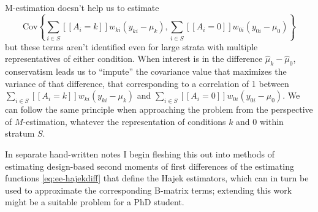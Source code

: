 M-estimation doesn't help us to estimate
\[
\mathrm{Cov}\left\{
\sum_{i\in S} [\![A_i=k]\!] w_{ki} (y_{ki} - \mu_k),
\sum_{i\in S} [\![A_i=0]\!] w_{0i} (y_{0i} - \mu_0)
\right\}
\]
but these terms aren't identified even for large strata with multiple
representatives of either condition. When interest is in the
difference $\hat{\mu}_k - \hat{\mu}_0$, conservatism leads us to
``impute'' the covariance value that maximizes the variance of that difference, that
corresponding to a correlation of 1 between $\sum_{i\in S} [\![A_i=k]\!] w_{ki}
(y_{ki} - \mu_k)$ and $\sum_{i\in S} [\![A_i=0]\!] w_{0i} (y_{0i} -
\mu_0)$. We can follow the same principle when approaching the problem
from the perspective of $M$-estimation, whatever the representation of
conditions $k$ and 0 within stratum $S$.

In separate hand-written
notes I begin fleshing this out into methods of estimating design-based second
moments of first differences of the estimating functions
\eqref{eq:ee-hajekdiff} that define the Hajek estimators, which
can in turn be used to approximate the corresponding B-matrix terms;
extending this work might be a suitable problem for a PhD student.

